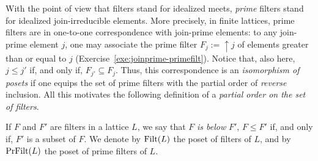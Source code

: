 With the point of view that filters stand for idealized meets, \emph{prime} filters stand for idealized join-irreducible elements. More precisely, in finite lattices, prime filters are in one-to-one correspondence with join-prime elements: to any join-prime element $j$, one may associate the prime filter $F_j := {\uparrow}j$ of elements greater than or equal to $j$ (Exercise~\ref{exe:joinprime-primefilt}). Notice that, also here, $j \leq j'$ if, and only if, $F_{j'} \subseteq F_j$. Thus, this correspondence is an \emph{isomorphism of posets} if one equips the set of prime filters with the partial order of \emph{reverse} inclusion. 
All this motivates the following definition of a \emph{partial order on the set of filters}.

\begin{definition}\label{def:filterorder}
If $F$ and $F'$ are filters in a lattice $L$, we say that $F$ \emph{is below} $F'$, $F \leq F'$ if, and only if, $F'$ is a subset of $F$. We denote by $\mathrm{Filt}(L)$ the poset of filters of $L$, and by $\mathrm{PrFilt}(L)$ the poset of prime filters of $L$.
\end{definition}




